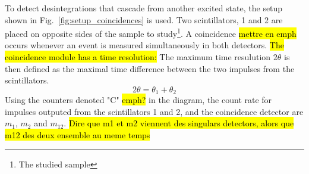 To detect desintegrations that cascade from another excited state, the setup shown in \hbox{Fig. \ref{fig:setup_coincidences}} is used. 
Two scintillators, 1 and 2 are placed on opposite sides of the sample to study\footnote{The studied sample}. 
A coincidence \hl{mettre en emph} occurs whenever an event is measured simultaneously in both detectors. 
\hl{The coincidence module has a time resolution:}
The maximum time resulution \(2 \theta\) is then defined as the maximal time difference between the two impulses from the scintillators.
\begin{equation}
    2 \theta = \theta_1 + \theta_{2}
\end{equation}
Using the counters denoted "C" \hl{emph?} in the diagram, the count rate for impulses outputed from the scintillators 1 and 2, and the coincidence detector are \(m_1\), \(m_2\) and \(m_{12}\). 
\hl{Dire que m1 et m2 viennent des singulars detectors, alors que m12 des deux ensemble au meme temps}

